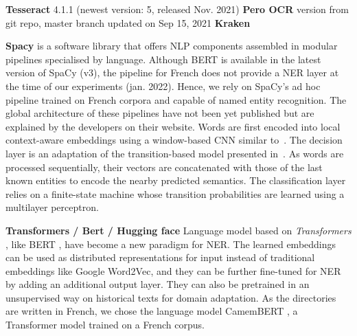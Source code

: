 \textbf{Tesseract} 4.1.1 (newest version: 5, released Nov. 2021)
\textbf{Pero OCR} version from git repo, master branch updated on Sep 15, 2021
\textbf{Kraken}

\textbf{Spacy} is a software library that offers NLP components assembled in modular pipelines specialised by language.
Although BERT is available in the latest version of SpaCy (v3), the pipeline for French does not provide a NER layer at the time of our experiments (jan. 2022).
Hence, we rely on SpaCy's ad hoc pipeline trained on French corpora and capable of named entity recognition.
The global architecture of these pipelines have not been yet published but are explained by the developers on their website.
Words are first encoded into local context-aware embeddings using a window-based CNN similar to~\cite{collobert2011}.
The decision layer is an adaptation of the transition-based model presented in~\cite{lample2016}.
As words are processed sequentially, their vectors are concatenated with those of the last known entities to encode the nearby predicted semantics.
The classification layer relies on a finite-state machine whose transition probabilities are learned using a multilayer perceptron.



\textbf{Transformers / Bert / Hugging face}
Language model based on \textit{Transformers} \cite{vaswani2017attention}, like BERT \cite{devlin2018bert}, have become a new paradigm for NER\cite{li2020}. 
The learned embeddings can be used as distributed representations for input instead of traditional embeddings like Google Word2Vec, and they can be further fine-tuned for NER by adding an additional output layer. 
They can also be pretrained in an unsupervised way on historical texts for domain adaptation.
As the directories are written in French, we chose the language model CamemBERT \cite{martin-etal-2020-camembert}, a Transformer model trained on a French corpus.

